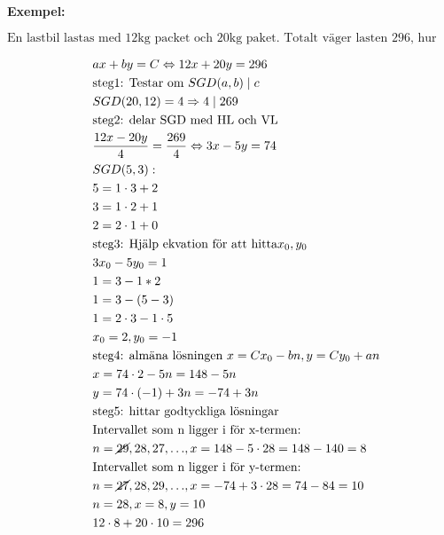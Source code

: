 \textbf{Exempel:}\par
\begin{equation}
  \text{En lastbil lastas med 12kg packet och 20kg paket. Totalt väger lasten 296, hur många av varge packet?}
\end{equation}

\begin{align*}
  &\quad  ax + by = C \Leftrightarrow 12x + 20y = 296 \\
  &\quad  \text{steg1: Testar om } SGD(a,b) \mid c \\
  &\quad  SGD(20,12) = 4 \Rightarrow 4 \mid 269 \\
  &\quad  \text{steg2: delar SGD med HL och VL} \\
  &\quad  \frac{12x - 20y}{4} = \frac{269}{4} \Leftrightarrow 3x - 5y = 74 \\
  &\quad  SGD(5,3): \\
  &\quad  5 = 1 \cdot 3 + 2 \\
  &\quad  3 = 1 \cdot 2 + 1 \\
  &\quad  2 = 2 \cdot 1 + 0 \\
  &\quad  \text{steg3: Hjälp ekvation för att hitta} x_0, y_0 \\
  &\quad  3x_0 - 5y_0 = 1 \\
  &\quad  1 = 3 - 1 * 2 \\
  &\quad  1 = 3 - (5 - 3) \\
  &\quad  1 = 2 \cdot 3 - 1 \cdot 5 \\
  &\quad  x_0 = 2, y_0 = -1 \\
  &\quad  \text{steg4: almäna lösningen } x = Cx_0 - bn, y = Cy_0 + an \\
  &\quad  x = 74 \cdot 2 - 5n = 148 - 5n \\
  &\quad  y = 74 \cdot (-1) + 3n = -74 + 3n \\
  &\quad  \text{steg5: hittar godtyckliga lösningar} \\
  &\quad  \text{Intervallet som n ligger i för x-termen:} \\
  &\quad  n = {\cancel{29}, 28, 27, \ldots }, x = 148 - 5 \cdot 28 = 148 - 140 = 8 \\ 
  &\quad  \text{Intervallet som n ligger i för y-termen:} \\
  &\quad  n = {\cancel{27}, 28, 29, \ldots }, x = -74 + 3 \cdot 28 = 74 - 84 = 10 \\
  &\quad  n = 28, x=8, y=10 \\
  &\quad  12 \cdot 8 + 20 \cdot 10 = 296 \\
\end{align*}


